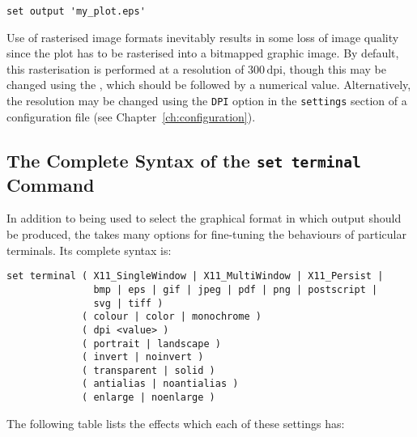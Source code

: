 \begin{verbatim}
set output 'my_plot.eps'
\end{verbatim}

Use of rasterised image formats inevitably results in some loss of image
quality since the plot has to be rasterised into a bitmapped graphic image. By
default, this rasterisation is performed at a resolution of
$300\,\mathrm{dpi}$, though this may be changed using the , which should be followed by a numerical value. Alternatively, the
resolution may be changed using the {\tt DPI} option in the {\tt settings}
section of a configuration file (see Chapter~\ref{ch:configuration}).

\subsection{The Complete Syntax of the {\tt set terminal} Command}

In addition to being used to select the graphical format in which output should
be produced, the  takes many options for fine-tuning the
behaviours of particular terminals. Its complete syntax is:

\begin{verbatim}
set terminal ( X11_SingleWindow | X11_MultiWindow | X11_Persist |
               bmp | eps | gif | jpeg | pdf | png | postscript |
               svg | tiff )
             ( colour | color | monochrome )
             ( dpi <value> )
             ( portrait | landscape )
             ( invert | noinvert )
             ( transparent | solid )
             ( antialias | noantialias )
             ( enlarge | noenlarge )
\end{verbatim}

The following table lists the effects which each of these settings has:


